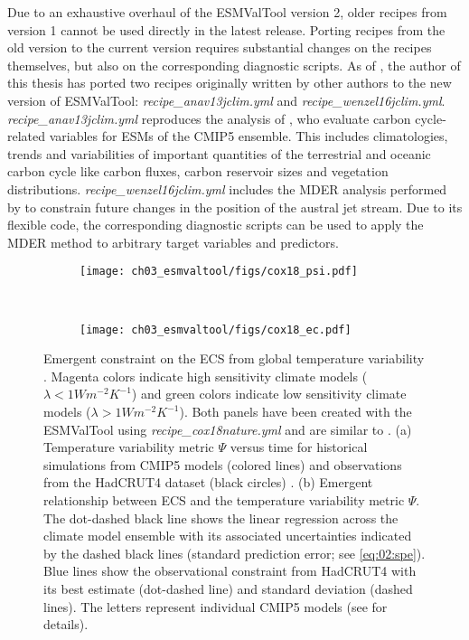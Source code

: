 Due to an exhaustive overhaul of the \ac{ESMValTool} version 2, older recipes
from version 1 \autocite{Eyring2016a} cannot be used directly in the latest
release. Porting recipes from the old version to the current version requires
substantial changes on the recipes themselves, but also on the corresponding
diagnostic scripts. As of \TheMonth{}, the author of this thesis has ported two
recipes originally written by other authors to the new version of
\ac{ESMValTool}: \emph{recipe\_anav13jclim.yml} and
\emph{recipe\_wenzel16jclim.yml}. \emph{recipe\_anav13jclim.yml} reproduces the
analysis of \textcite{Anav2013}, who evaluate carbon cycle-related variables
for \acp{ESM} of the \acs{CMIP}5 ensemble. This includes climatologies, trends
and variabilities of important quantities of the terrestrial and oceanic carbon
cycle like carbon fluxes, carbon reservoir sizes and vegetation distributions.
\emph{recipe\_wenzel16jclim.yml} includes the \ac{MDER} analysis performed by
\textcite{Wenzel2016a} to constrain future changes in the position of the
austral jet stream. Due to its flexible code, the corresponding diagnostic
scripts can be used to apply the \ac{MDER} method to arbitrary target variables
and predictors.

\begin{figure}[t]
  \centering
  \begin{subfigure}[b]{\SubfigureWidth{}}
    \texttt{[image: ch03\_esmvaltool/figs/cox18\_psi.pdf]}
    \caption{}
    \label{fig:03:cox18:a}
  \end{subfigure}
  ~
  \begin{subfigure}[b]{\SubfigureWidth{}}
    \texttt{[image: ch03\_esmvaltool/figs/cox18\_ec.pdf]}
    \caption{}
    \label{fig:03:cox18:b}
  \end{subfigure}
  \caption{Emergent constraint on the \acf{ECS} from global temperature
    variability \autocite{Cox2018}. Magenta colors indicate high sensitivity
    climate models ($\lambda < 1 \unit{W m^{-2} K^{-1}}$) and green colors
    indicate low sensitivity climate models ($\lambda > 1 \unit{W m^{-2}
      K^{-1}}$). Both panels have been created with the \acs{ESMValTool} using
    \emph{recipe\_cox18nature.yml} and are similar to \textcite{Cox2018}. (a)
    Temperature variability metric $\Psi$ versus time for historical
    simulations from \acs{CMIP}5 models (colored lines) and observations from
    the HadCRUT4 dataset (black circles) \autocite{Morice2012}. (b) Emergent
    relationship between \acs{ECS} and the temperature variability metric
    $\Psi$. The dot-dashed black line shows the linear regression across the
    climate model ensemble with its associated uncertainties indicated by the
    dashed black lines (standard prediction error; see \cref{eq:02:spe}). Blue
    lines show the observational constraint from HadCRUT4 with its best
    estimate (dot-dashed line) and standard deviation (dashed lines). The
    letters represent individual \acs{CMIP}5 models (see \textcite{Cox2018}
    for details).}
  \label{fig:03:cox18}
\end{figure}


